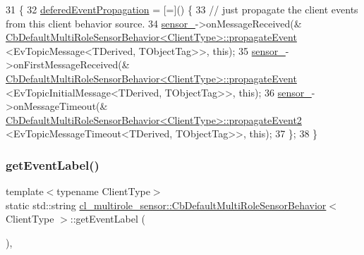 \begin{DoxyCode}
31   \{
32     \hyperlink{classcl__multirole__sensor_1_1CbDefaultMultiRoleSensorBehavior_a18f86fd2fd9c3575b62a2c58953b7d33}{deferedEventPropagation} = [=]() \{
33       \textcolor{comment}{// just propagate the client events from this client behavior source.}
34       \hyperlink{classcl__multirole__sensor_1_1CbDefaultMultiRoleSensorBehavior_a201893c3c859259eac3166405f3509cb}{sensor\_}->onMessageReceived(&
      \hyperlink{classcl__multirole__sensor_1_1CbDefaultMultiRoleSensorBehavior_af0017775207108c81f879fe222a69ea9}{CbDefaultMultiRoleSensorBehavior<ClientType>::propagateEvent}
      <EvTopicMessage<TDerived, TObjectTag>>, \textcolor{keyword}{this});
35       \hyperlink{classcl__multirole__sensor_1_1CbDefaultMultiRoleSensorBehavior_a201893c3c859259eac3166405f3509cb}{sensor\_}->onFirstMessageReceived(&
      \hyperlink{classcl__multirole__sensor_1_1CbDefaultMultiRoleSensorBehavior_af0017775207108c81f879fe222a69ea9}{CbDefaultMultiRoleSensorBehavior<ClientType>::propagateEvent}
      <EvTopicInitialMessage<TDerived, TObjectTag>>, \textcolor{keyword}{this});
36       \hyperlink{classcl__multirole__sensor_1_1CbDefaultMultiRoleSensorBehavior_a201893c3c859259eac3166405f3509cb}{sensor\_}->onMessageTimeout(&
      \hyperlink{classcl__multirole__sensor_1_1CbDefaultMultiRoleSensorBehavior_ac8773ca7b467bad85219261f5d23a3ce}{CbDefaultMultiRoleSensorBehavior<ClientType>::propagateEvent2}
      <EvTopicMessageTimeout<TDerived, TObjectTag>>, \textcolor{keyword}{this});
37     \};
38   \}
\end{DoxyCode}
\mbox{\label{classcl__multirole__sensor_1_1CbDefaultMultiRoleSensorBehavior_aced8a722660f2ecd7bad11a9dde31aa8}} 
\subsubsection{\texorpdfstring{get\+Event\+Label()}{getEventLabel()}}
{\footnotesize\ttfamily template$<$typename Client\+Type$>$ \\
static std\+::string \hyperlink{classcl__multirole__sensor_1_1CbDefaultMultiRoleSensorBehavior}{cl\+\_\+multirole\+\_\+sensor\+::\+Cb\+Default\+Multi\+Role\+Sensor\+Behavior}$<$ Client\+Type $>$\+::get\+Event\+Label (\begin{DoxyParamCaption}{ }\end{DoxyParamCaption})\hspace{0.3cm}{\ttfamily [inline]}, {\ttfamily [static]}}



